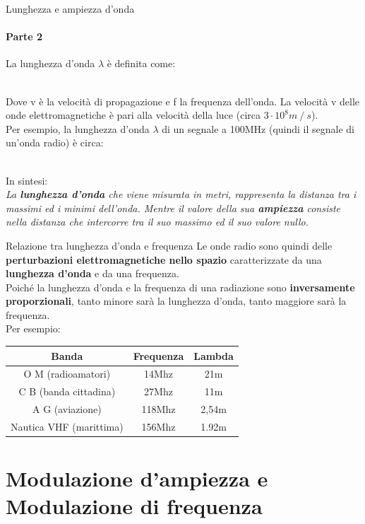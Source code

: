 \documentclass[aspectratio=169]{beamer}
\newcommand*{\vet}{\fontfamily{qzc}\selectfont}
\begin{document}
\begin{frame}{Lunghezza e ampiezza d'onda}
	\framesubtitle{Parte 2}
	La lunghezza d'onda $\lambda$ è definita come:\\
	\medskip
	\centering{$\lambda = \frac{{\vet v}}{{\vet f}}$}\\
	\smallskip
	\raggedright{Dove {\vet v} è la velocità di propagazione e {\vet f} la frequenza dell'onda. La velocità {\vet v} delle onde elettromagnetiche è pari alla velocità della luce (circa $3 \cdot 10^8 m\mathbin{/}s$)}.\\
	\medskip
	Per esempio, la lunghezza d'onda $\lambda$ di un segnale a 100MHz (quindi il segnale di un'onda radio) è circa:\\
	\medskip
	\\
	\medskip
	\raggedright{In sintesi:}\\
	\emph{La \textbf{lunghezza d'onda} che viene misurata in metri, rappresenta la distanza tra i massimi ed i minimi dell'onda. Mentre il valore della sua \textbf{ampiezza} consiste nella distanza che intercorre tra il suo massimo ed il suo valore nullo.}
\end{frame}

\begin{frame}{Relazione tra lunghezza d'onda e frequenza}
	Le onde radio sono quindi delle \textbf{perturbazioni elettromagnetiche nello spazio} caratterizzate da una \textbf{lunghezza d'onda} e da una frequenza.\\
	Poiché la lunghezza d'onda e la frequenza di una radiazione sono \textbf{inversamente proporzionali}, tanto minore sarà la lunghezza d'onda, tanto maggiore sarà la frequenza.\\
	\medskip
	Per esempio:\\
	\centering
	\begin{tabular}{|c|c|c|}
		\hline
		\textbf{Banda}& \textbf{Frequenza} & \textbf{Lambda} \\
		\hline
		O M (radioamatori)& 14Mhz & 21m \\
		\hline
		C B (banda cittadina)& 27Mhz & 11m\\
		\hline
		A G (aviazione)& 118Mhz & 2,54m \\
		\hline
		Nautica VHF (marittima)& 156Mhz & 1.92m \\
		\hline
	\end{tabular}
\end{frame}

\section{Modulazione d'ampiezza e Modulazione di frequenza}
\begin{frame}
	\\
\end{frame}
\end{document}

